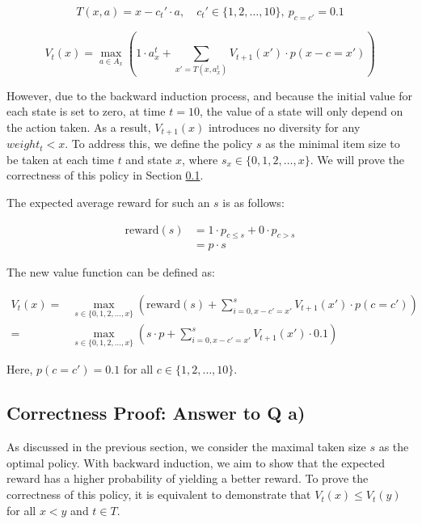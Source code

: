 \begin{equation}
T(x, a) = x - c_t' \cdot a, \quad c_t' \in \{1,2,\ldots,10\}, \ p_{c=c'} = 0.1
\end{equation}

\begin{equation}
V_t(x) = \max_{a \in A_x}\left(1 \cdot a_x^t + \sum_{x' = T(x, a_x^t)} V_{t+1}(x') \cdot p(x-c=x')\right)
\end{equation}

However, due to the backward induction process, and because the initial value for each state is set to zero, at time $t=10$, the value of a state will only depend on the action taken. As a result, $V_{t+1}(x)$ introduces no diversity for any $weight_t < x$. To address this, we define the policy $s$ as the minimal item size to be taken at each time $t$ and state $x$, where $s_x \in \{0,1,2,\ldots,x\}$. We will prove the correctness of this policy in Section \ref{sec:1.a}.

The expected average reward for such an $s$ is as follows:

\begin{equation}
\begin{aligned}
\text{reward}(s) & = 1 \cdot p_{c \leq s} + 0 \cdot p_{c > s} \\
& = p \cdot s
\end{aligned}
\end{equation}

The new value function can be defined as:

\begin{equation}
\begin{aligned}
V_t(x) = & \max_{s \in \{0,1,2,\ldots,x\}}\left(\text{reward}(s) + \sum_{i=0,x-c'=x'}^s V_{t+1}(x') \cdot p(c=c')\right) \\
=& \max_{s \in \{0,1,2,\ldots,x\}}\left(s \cdot p + \sum_{i=0,x-c'=x'}^s V_{t+1}(x') \cdot 0.1\right)
\end{aligned}
\end{equation}

Here, $p(c=c') = 0.1$ for all $c \in \{1,2,\ldots,10\}$.


\subsection{Correctness Proof: Answer to Q a)}
\label{sec:1.a}

As discussed in the previous section, we consider the maximal taken size $s$ as the optimal policy. With backward induction, we aim to show that the expected reward has a higher probability of yielding a better reward. To prove the correctness of this policy, it is equivalent to demonstrate that $V_t(x) \leq V_t(y)$ for all $x < y$ and $t \in T$.

